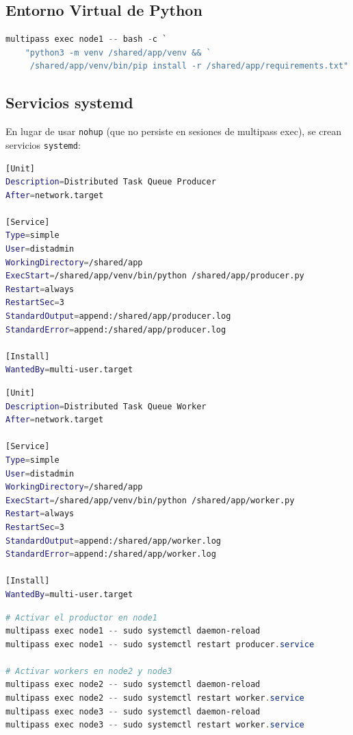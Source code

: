\documentclass[12pt,a4paper]{article}
\begin{document}
\subsection{Entorno Virtual de Python}

\begin{lstlisting}[language=powershell, title=Configuración del entorno Python]
multipass exec node1 -- bash -c `
    "python3 -m venv /shared/app/venv && `
     /shared/app/venv/bin/pip install -r /shared/app/requirements.txt"
\end{lstlisting}

\subsection{Servicios systemd}

En lugar de usar \texttt{nohup} (que no persiste en sesiones de multipass exec), se crean servicios \texttt{systemd}:

\begin{lstlisting}[language=bash, title=producer.service (node1)]
[Unit]
Description=Distributed Task Queue Producer
After=network.target

[Service]
Type=simple
User=distadmin
WorkingDirectory=/shared/app
ExecStart=/shared/app/venv/bin/python /shared/app/producer.py
Restart=always
RestartSec=3
StandardOutput=append:/shared/app/producer.log
StandardError=append:/shared/app/producer.log

[Install]
WantedBy=multi-user.target
\end{lstlisting}

\begin{lstlisting}[language=bash, title=worker.service (node2 y node3)]
[Unit]
Description=Distributed Task Queue Worker
After=network.target

[Service]
Type=simple
User=distadmin
WorkingDirectory=/shared/app
ExecStart=/shared/app/venv/bin/python /shared/app/worker.py
Restart=always
RestartSec=3
StandardOutput=append:/shared/app/worker.log
StandardError=append:/shared/app/worker.log

[Install]
WantedBy=multi-user.target
\end{lstlisting}

\begin{lstlisting}[language=powershell, title=Activación de servicios]
# Activar el productor en node1
multipass exec node1 -- sudo systemctl daemon-reload
multipass exec node1 -- sudo systemctl restart producer.service

# Activar workers en node2 y node3
multipass exec node2 -- sudo systemctl daemon-reload
multipass exec node2 -- sudo systemctl restart worker.service
multipass exec node3 -- sudo systemctl daemon-reload
multipass exec node3 -- sudo systemctl restart worker.service
\end{lstlisting}
\end{document}

